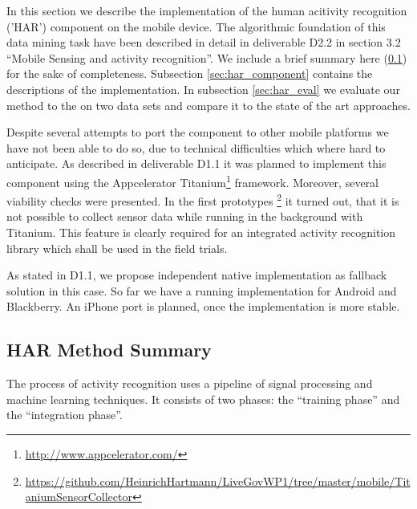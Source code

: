 \label{sec:HAR}

In this section we describe the implementation of the human acitivity
recognition ('HAR') component on the mobile device.  The algorithmic
foundation of this data mining task have been described in detail in
deliverable D2.2 in section 3.2 ``Mobile Sensing and activity
recognition''. We include a brief summary here (\ref{sec:har_method})
for the sake of completeness. Subsection \ref{sec:har_component}
contains the descriptions of the implementation. In subsection
\ref{sec:har_eval} we evaluate our method to the on two data sets and
compare it to the state of the art approaches.

Despite several attempts to port the component to other mobile
platforms we have not been able to do so, due to technical
difficulties which where hard to anticipate. As described in
deliverable D1.1 it was planned to implement this component using the
Appcelerator Titanium\footnote{\url{http://www.appcelerator.com/}}
framework. Moreover, several viability checks were presented. In the
first prototypes
\footnote{\url{https://github.com/HeinrichHartmann/LiveGovWP1/tree/master/mobile/TitaniumSensorCollector}}
it turned out, that it is not possible to collect sensor data while
running in the background with Titanium. This feature is clearly
required for an integrated activity recognition library which shall be
used in the field trials.

As stated in D1.1, we propose independent native implementation as
fallback solution in this case. So far we have a running
implementation for Android and Blackberry. An iPhone port is planned,
once the implementation is more stable.


\subsection{HAR Method Summary}\label{sec:har_method}

The process of activity recognition uses a pipeline of signal
processing and machine learning techniques. It consists of two phases:
the ``training phase'' and the ``integration phase''. 

